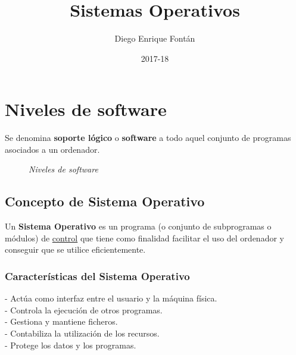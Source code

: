 \documentclass[spanish, 12pt]{article}
\title{Sistemas Operativos}
\author{Diego Enrique Fontán}
\date{2017-18}
\begin{document}
	\maketitle
	\newpage
	
	\tableofcontents
	\newpage
	
	
	\section{Niveles de software}
	
	\vfill
	
		Se denomina \textbf{soporte lógico} o \textbf{software} a todo aquel conjunto de programas asociados a un ordenador.\\
		
		\begin{figure}[H]
			\centering
			\caption*{\textit{Niveles de software}}
		\end{figure}
		
		\subsection{Concepto de Sistema Operativo}
		
			Un \textbf{Sistema Operativo} es un programa (o conjunto de subprogramas o módulos) de \underline{control} que tiene como finalidad facilitar el uso del ordenador y conseguir que se utilice eficientemente.\\
			
			\subsubsection{Características del Sistema Operativo}
			
				- Actúa como interfaz entre el usuario y la máquina física.\\
			
				- Controla la ejecución de otros programas.\\
				
				- Gestiona y mantiene ficheros.\\
			
				- Contabiliza la utilización de los recursos.\\
			
				- Protege los datos y los programas.\\
			
\end{document}

